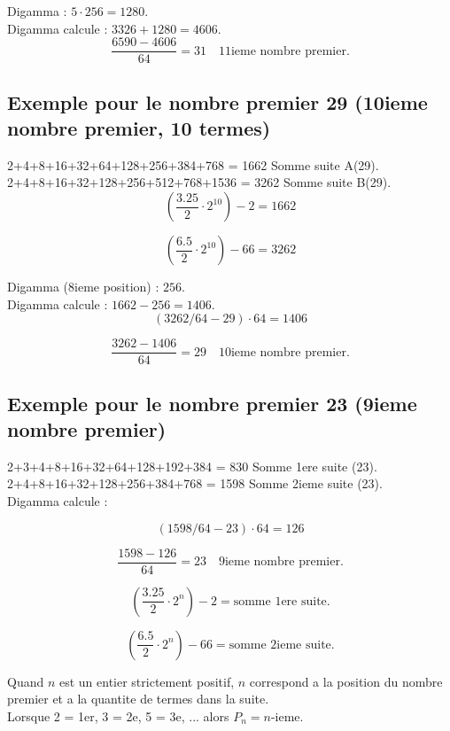 \documentclass[a4paper,11pt]{article}
\begin{document}
Digamma : \(5 \cdot 256 = 1280\).\\
Digamma calcule : \(3326 + 1280 = 4606\).\\

\[
\frac{6590 - 4606}{64} = 31 \quad \text{11ieme nombre premier.}
\]

\bigskip

\subsection*{Exemple pour le nombre premier 29 (10ieme nombre premier, 10 termes)}

2+4+8+16+32+64+128+256+384+768 = 1662 Somme suite A(29).\\
2+4+8+16+32+128+256+512+768+1536 = 3262 Somme suite B(29).\\

\[
\left(\frac{3.25}{2} \cdot 2^{10}\right) - 2 = 1662
\]

\[
\left(\frac{6.5}{2} \cdot 2^{10}\right) - 66 = 3262
\]

Digamma (8ieme position) : \(256\).\\
Digamma calcule : \(1662 - 256 = 1406\).\\

\[
(3262/64 - 29) \cdot 64 = 1406
\]

\[
\frac{3262 - 1406}{64} = 29 \quad \text{10ieme nombre premier.}
\]

\bigskip

\subsection*{Exemple pour le nombre premier 23 (9ieme nombre premier)}

2+3+4+8+16+32+64+128+192+384 = 830 Somme 1ere suite (23).\\
2+4+8+16+32+128+256+384+768 = 1598 Somme 2ieme suite (23).\\

Digamma calcule :

\[
(1598/64 - 23) \cdot 64 = 126
\]

\[
\frac{1598 - 126}{64} = 23 \quad \text{9ieme nombre premier.}
\]

\[
\left(\frac{3.25}{2} \cdot 2^{n}\right) - 2 = \text{somme 1ere suite.}
\]

\[
\left(\frac{6.5}{2} \cdot 2^{n}\right) - 66 = \text{somme 2ieme suite.}
\]

Quand \(n\) est un entier strictement positif, \(n\) correspond a la position du nombre premier et a la quantite de termes dans la suite.\\
Lorsque 2 = 1er, 3 = 2e, 5 = 3e, ... alors \(P_{n} = n\)-ieme.
\end{document}
